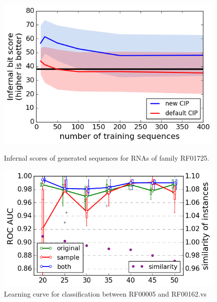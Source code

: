 \documentclass{article}
\begin{document}
\begin{figure}[ht]
      \centering
  \begin{minipage}[b]{0.44\textwidth}
    \includegraphics[width=\textwidth]{images/infernal_abstr.png}
    \caption{Infernal scores of generated sequences for RNAs of family RF01725.}
      \label{infeval}
  \end{minipage}
  \hfill
  \begin{minipage}[b]{0.52\textwidth}
    \includegraphics[width=\textwidth]{images/learningcurve.png}
    \caption{Learning curve for classification between RF00005 and RF00162.vs}
     \label{learncurve}
  \end{minipage}
\end{figure}


\end{document}
